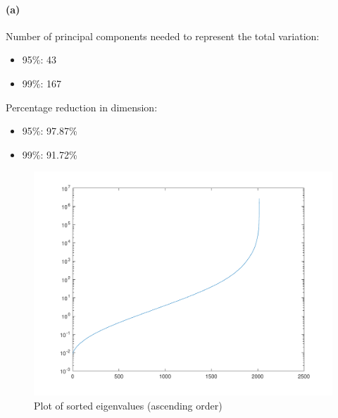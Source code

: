 \documentclass[12pt]{article}
\begin{document}
\paragraph{(a)}
Number of principal components needed to represent the total variation:
\begin{itemize}
    \item 95\%: 43
    \item 99\%: 167 
\end{itemize}
Percentage reduction in dimension:
\begin{itemize}
    \item 95\%: 97.87\%
    \item 99\%: 91.72\%
\end{itemize}
\begin{figure}[htbp]
    \centering
    \includegraphics[width=\textwidth]{./hw5/problem2/hw5p2a.pdf}
    \caption{Plot of sorted eigenvalues (ascending order)}
\end{figure}
\end{document}

